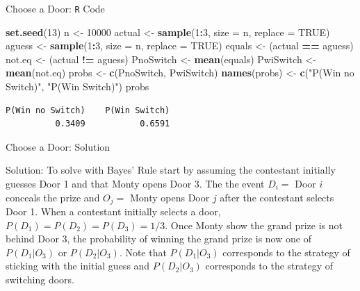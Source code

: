\documentclass[
  ignorenonframetext,
]{beamer}
\newenvironment{Shaded}{\begin{snugshade}}{\end{snugshade}}
\newcommand{\AttributeTok}[1]{\textcolor[rgb]{0.13,0.29,0.53}{#1}}
\newcommand{\ConstantTok}[1]{\textcolor[rgb]{0.56,0.35,0.01}{#1}}
\newcommand{\DecValTok}[1]{\textcolor[rgb]{0.00,0.00,0.81}{#1}}
\newcommand{\FunctionTok}[1]{\textcolor[rgb]{0.13,0.29,0.53}{\textbf{#1}}}
\newcommand{\NormalTok}[1]{#1}
\newcommand{\OtherTok}[1]{\textcolor[rgb]{0.56,0.35,0.01}{#1}}
\newcommand{\SpecialCharTok}[1]{\textcolor[rgb]{0.81,0.36,0.00}{\textbf{#1}}}
\newcommand{\StringTok}[1]{\textcolor[rgb]{0.31,0.60,0.02}{#1}}
\begin{document}
\begin{frame}[fragile]{Choose a Door: \texttt{R} Code}
\protect\hypertarget{choose-a-door-r-code}{}
\small

\begin{Shaded}
\begin{Highlighting}[]
\FunctionTok{set.seed}\NormalTok{(}\DecValTok{13}\NormalTok{)}
\NormalTok{n }\OtherTok{\textless{}{-}} \DecValTok{10000}
\NormalTok{actual }\OtherTok{\textless{}{-}} \FunctionTok{sample}\NormalTok{(}\DecValTok{1}\SpecialCharTok{:}\DecValTok{3}\NormalTok{, }\AttributeTok{size =}\NormalTok{ n, }\AttributeTok{replace =} \ConstantTok{TRUE}\NormalTok{)}
\NormalTok{aguess }\OtherTok{\textless{}{-}} \FunctionTok{sample}\NormalTok{(}\DecValTok{1}\SpecialCharTok{:}\DecValTok{3}\NormalTok{, }\AttributeTok{size =}\NormalTok{ n, }\AttributeTok{replace =} \ConstantTok{TRUE}\NormalTok{)}
\NormalTok{equals }\OtherTok{\textless{}{-}}\NormalTok{ (actual }\SpecialCharTok{==}\NormalTok{ aguess)}
\NormalTok{not.eq }\OtherTok{\textless{}{-}}\NormalTok{ (actual }\SpecialCharTok{!=}\NormalTok{ aguess)}
\NormalTok{PnoSwitch }\OtherTok{\textless{}{-}} \FunctionTok{mean}\NormalTok{(equals)}
\NormalTok{PwiSwitch }\OtherTok{\textless{}{-}} \FunctionTok{mean}\NormalTok{(not.eq)}
\NormalTok{probs }\OtherTok{\textless{}{-}} \FunctionTok{c}\NormalTok{(PnoSwitch, PwiSwitch)}
\FunctionTok{names}\NormalTok{(probs) }\OtherTok{\textless{}{-}} \FunctionTok{c}\NormalTok{(}\StringTok{"P(Win no Switch)"}\NormalTok{, }\StringTok{"P(Win Switch)"}\NormalTok{)}
\NormalTok{probs}
\end{Highlighting}
\end{Shaded}

\begin{verbatim}
P(Win no Switch)    P(Win Switch) 
          0.3409           0.6591 
\end{verbatim}

\normalsize
\end{frame}

\begin{frame}{Choose a Door: Solution}
\protect\hypertarget{choose-a-door-solution}{}
\begin{tcolorbox}
Solution: To solve with Bayes' Rule start by assuming the contestant initially guesses Door 1 and that Monty opens Door 3. The the event $D_i=$ Door $i$ conceals the prize and
$O_j=$ Monty opens Door $j$ after the contestant selects Door 1. When a contestant initially selects a door, $P(D_1)=P(D_2)=P(D_3)=1/3$. Once Monty show the grand prize is not behind Door 3, the probability of winning the grand prize is now one of $P(D_1|O_3)$ or $P(D_2|O_3)$. Note that $P(D_1|O_3)$ corresponds to the strategy of sticking with the initial guess and $P(D_2|O_3)$ corresponds to the strategy of switching doors.
\end{tcolorbox}
\end{frame}
\end{document}

